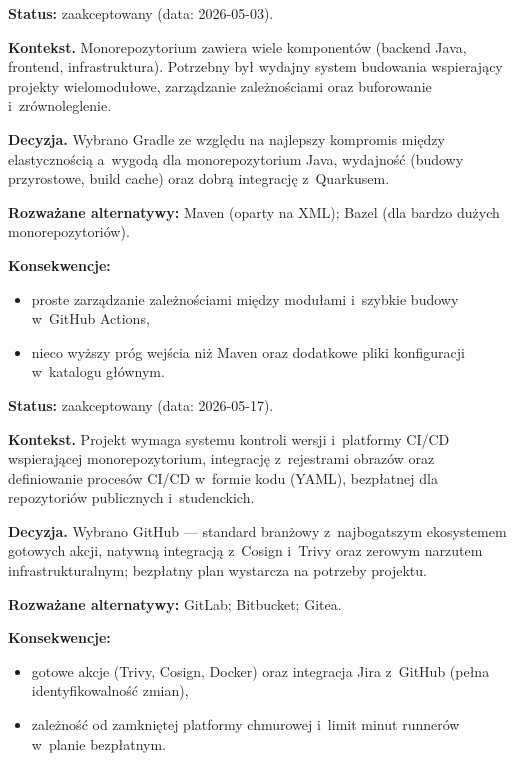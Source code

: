 \textbf{Status:} zaakceptowany (data: 2026-05-03).

\textbf{Kontekst.} Monorepozytorium zawiera wiele komponentów (backend Java, frontend, infrastruktura). Potrzebny był wydajny system budowania wspierający projekty wielomodułowe, zarządzanie zależnościami oraz buforowanie i~zrównoleglenie.

\textbf{Decyzja.} Wybrano Gradle ze względu na najlepszy kompromis między elastycznością a~wygodą dla monorepozytorium Java, wydajność (budowy przyrostowe, build cache) oraz dobrą integrację z~Quarkusem.

\textbf{Rozważane alternatywy:} Maven (oparty na XML); Bazel (dla bardzo dużych monorepozytoriów).

\textbf{Konsekwencje:}
\begin{itemize}
  \item[$+$] proste zarządzanie zależnościami między modułami i~szybkie budowy w~GitHub Actions,
  \item[$-$] nieco wyższy próg wejścia niż Maven oraz dodatkowe pliki konfiguracji w~katalogu głównym.
\end{itemize}


\textbf{Status:} zaakceptowany (data: 2026-05-17).

\textbf{Kontekst.} Projekt wymaga systemu kontroli wersji i~platformy CI/CD wspierającej monorepozytorium, integrację z~rejestrami obrazów oraz definiowanie procesów CI/CD w~formie kodu (YAML), bezpłatnej dla repozytoriów publicznych i~studenckich.

\textbf{Decyzja.} Wybrano GitHub --- standard branżowy z~najbogatszym ekosystemem gotowych akcji, natywną integracją z~Cosign i~Trivy oraz zerowym narzutem infrastrukturalnym; bezpłatny plan wystarcza na potrzeby projektu.

\textbf{Rozważane alternatywy:} GitLab; Bitbucket; Gitea.

\textbf{Konsekwencje:}
\begin{itemize}
  \item[$+$] gotowe akcje (Trivy, Cosign, Docker) oraz integracja Jira z~GitHub (pełna identyfikowalność zmian),
  \item[$-$] zależność od zamkniętej platformy chmurowej i~limit minut runnerów w~planie bezpłatnym.
\end{itemize}


